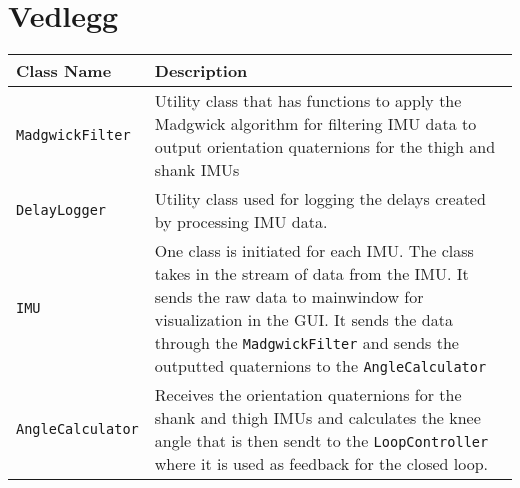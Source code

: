 
\section{Vedlegg}


  

\begin{table}[H]
\centering
\renewcommand{\arraystretch}{1.3} %
\begin{tcolorbox}[
    colback=white,      %
    colframe=black,     %
    arc=3mm,            %
    boxrule=0.5mm,      %
    width=\textwidth,   %
    halign=center       %
]
\begin{tabular}{p{} | p{}} %
\textbf{Class Name} & \textbf{Description} \\ \hline
\texttt{MadgwickFilter} & Utility class that has functions to apply the Madgwick algorithm for filtering IMU data to output orientation quaternions for the thigh and shank IMUs \\

\texttt{DelayLogger} & Utility class used for logging the delays created by processing IMU data. \\

\texttt{IMU} & One class is initiated for each IMU. The class takes in the stream of data from the IMU. It sends the raw data to mainwindow for visualization in the GUI. It sends the data through the \texttt{MadgwickFilter} and sends the outputted quaternions to the \texttt{AngleCalculator} \\

\texttt{AngleCalculator} & Receives the orientation quaternions for the shank and thigh IMUs and calculates the knee angle that is then sendt to the \texttt{LoopController} where it is used as feedback for the closed loop.\\


\end{tabular}
\end{tcolorbox}
\end{table}
